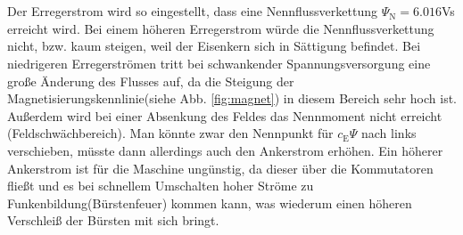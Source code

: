 \section{}\label{sec:aufg4_d}
%
Der Erregerstrom wird so eingestellt, dass eine Nennflussverkettung $\Psi_\text{N} = 6.016$Vs erreicht wird. Bei einem höheren Erregerstrom würde die Nennflussverkettung nicht, bzw. kaum steigen, weil der Eisenkern sich in Sättigung befindet. Bei niedrigeren Erregerströmen tritt bei schwankender Spannungsversorgung eine große Änderung des Flusses auf, da die Steigung der Magnetisierungskennlinie(siehe Abb. \ref{fig:magnet}) in diesem Bereich sehr hoch ist. Außerdem wird bei einer Absenkung des Feldes das Nennmoment nicht erreicht (Feldschwächbereich). Man könnte zwar den Nennpunkt für $c_\text{E}\Psi$ nach links verschieben, müsste dann allerdings auch den Ankerstrom erhöhen. Ein höherer Ankerstrom ist für die Maschine ungünstig, da dieser über die Kommutatoren fließt und es bei schnellem Umschalten hoher Ströme zu Funkenbildung(Bürstenfeuer) kommen kann, was wiederum einen höheren Verschleiß der Bürsten mit sich bringt.
%
\clearpage